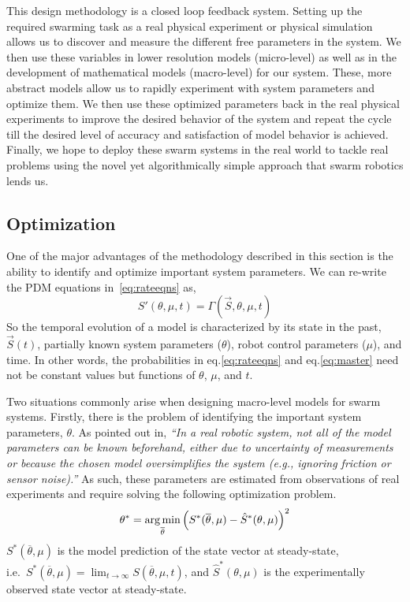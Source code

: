\documentclass[Main.tex]{subfiles}
\begin{document}
This design methodology is a closed loop feedback system. Setting up the required swarming task as a real physical experiment or physical simulation allows us to discover and measure the different free parameters in the system. We then use these variables in lower resolution models (micro-level) as well as in the development of mathematical models (macro-level) for our system. These, more abstract models allow us to rapidly experiment with system parameters and optimize them. We then use these optimized parameters back in the real physical experiments to improve the desired behavior of the system and repeat the cycle till the desired level of accuracy and satisfaction of  model behavior is achieved. Finally, we hope to deploy these swarm systems in the real world to tackle real problems using the novel yet algorithmically simple approach that swarm robotics lends us.

\subsection{Optimization}\label{sec:opt}
One of the major advantages of the methodology described in this section is the ability to identify and optimize important system parameters. We can re-write the PDM equations in~\eqref{eq:rateeqns} as,
\begin{equation}
S'(\theta,\mu,t) = \Gamma\left(\vec{S}, \theta, \mu, t\right)
\end{equation}
So the temporal evolution of a model is characterized by its state in the past, $\vec{S}(t)$, partially known system parameters ($\theta$), robot control parameters ($\mu$), and time. In other words, the probabilities in eq.\eqref{eq:rateeqns} and eq.\eqref{eq:master} need not be constant values but functions of $\theta$, $\mu$, and $t$.

Two situations commonly arise when designing macro-level models for swarm systems. Firstly, there is the problem of identifying the important system parameters, $\theta$. As pointed out in\cite{Correll2008}, \emph{``In a real robotic system, not all of the model parameters can be known beforehand, either due to uncertainty of measurements or because the chosen model oversimplifies the system (e.g., ignoring friction or sensor noise).''} As such, these parameters are estimated from observations of real experiments and require solving the following optimization problem.
\begin{equation}
	\theta^* = \underset{\overline{\theta}}{\operatorname*{arg\,min}}\left(S^*(\overline{\theta},\mu) - \hat{S}^*(\theta, \mu)\right)^2 \label{eq:thetaopt}
\end{equation}
$S^*(\overline{\theta},\mu)$ is the model prediction of the state vector at steady-state,\\ i.e.~$S^*(\overline{\theta},\mu) = \lim_{t \to \infty}S(\overline{\theta},\mu, t)$, and $\hat{S}^*(\theta, \mu)$ is the experimentally observed state vector at steady-state.
\end{document}

